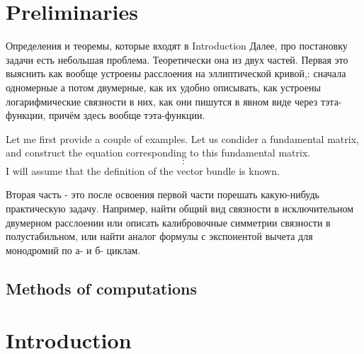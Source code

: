 \documentclass[../main.tex]{subfiles}
\begin{document}
    

    \section*{Preliminaries} \label{sec:prelim}
    Определения и теоремы, которые входят в Introduction
    Далее, про постановку задачи есть небольшая проблема.
    Теоретически она из двух частей.
Первая это выяснить как вообще устроены расслоения на эллиптической кривой,:
    сначала одномерные а потом двумерные, как их удобно описывать,
    как устроены логарифмические связности в них,
    как они пишутся в явном виде через тэта-функции,
    причём здесь вообще тэта-функции.

    Let me first provide a couple of examples. 
    Let us condider a fundamental matrix, and
    construct the equation corresponding
    to this fundamental matrix.
        \begin{equation}
                :
        \end{equation}
    I will assume that the definition of the vector bundle is known.

    Вторая часть - это после освоения первой части порешать какую-нибудь практическую задачу.
    Например, найти общий вид связности в исключительном двумерном расслоении
    или описать калибровочные симметрии связности в полустабильном,
    или найти аналог формулы с экспонентой вычета для монодромий по а- и б- циклам.


    \subsection*{Methods of computations}\label{subsec:методы-явных-вычислений}


    \section*{Introduction}\label{sec:introduction}
\end{document}
